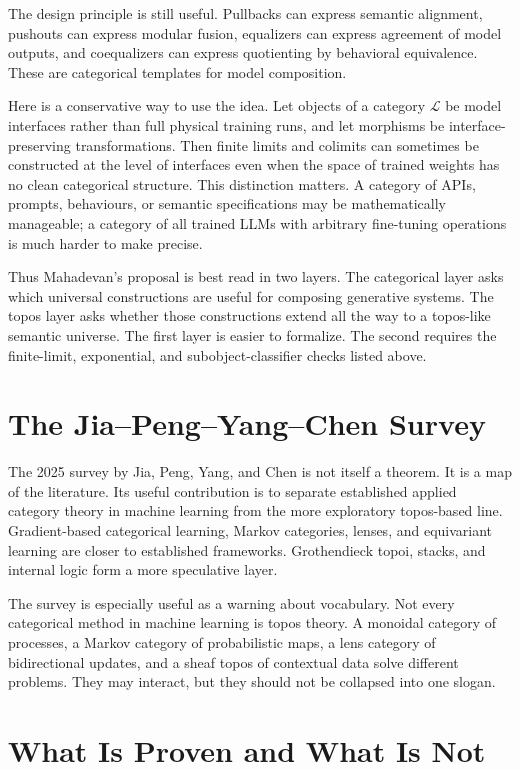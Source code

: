 \documentclass[11pt]{article}
\begin{document}
The design principle is still useful. Pullbacks can express semantic alignment,
pushouts can express modular fusion, equalizers can express agreement of model
outputs, and coequalizers can express quotienting by behavioral equivalence.
These are categorical templates for model composition.

Here is a conservative way to use the idea. Let objects of a category
\(\mathcal L\) be model interfaces rather than full physical training runs, and
let morphisms be interface-preserving transformations. Then finite limits and
colimits can sometimes be constructed at the level of interfaces even when the
space of trained weights has no clean categorical structure. This distinction
matters. A category of APIs, prompts, behaviours, or semantic specifications may
be mathematically manageable; a category of all trained LLMs with arbitrary
fine-tuning operations is much harder to make precise.

Thus Mahadevan's proposal is best read in two layers. The categorical layer
asks which universal constructions are useful for composing generative systems.
The topos layer asks whether those constructions extend all the way to a
topos-like semantic universe. The first layer is easier to formalize. The second
requires the finite-limit, exponential, and subobject-classifier checks listed
above.

\section{The Jia--Peng--Yang--Chen Survey}

The 2025 survey by Jia, Peng, Yang, and Chen is not itself a theorem. It is a
map of the literature. Its useful contribution is to separate established
applied category theory in machine learning from the more exploratory
topos-based line. Gradient-based categorical learning, Markov categories,
lenses, and equivariant learning are closer to established frameworks.
Grothendieck topoi, stacks, and internal logic form a more speculative layer.

The survey is especially useful as a warning about vocabulary. Not every
categorical method in machine learning is topos theory. A monoidal category of
processes, a Markov category of probabilistic maps, a lens category of
bidirectional updates, and a sheaf topos of contextual data solve different
problems. They may interact, but they should not be collapsed into one slogan.

\section{What Is Proven and What Is Not}
\end{document}
